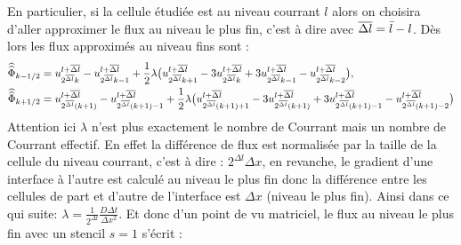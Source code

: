 En particulier, si la cellule étudiée est au niveau courrant $l$ alors on choisira d'aller approximer le flux au niveau le plus fin, c'est à dire avec ${\overline{\Delta l}} = \bar l - l$.
Dès lors les flux approximés au niveau fins sont : 
\begin{align}
    \widehat{\widehat{\Phi}}_{k-1/2} &=  u^{l+{\overline{\Delta l}}}_{2^{\overline{\Delta l}} k} -  u^{l+{\overline{\Delta l}}}_{2^{\overline{\Delta l}} k-1} + \frac{1}{2} \lambda \bigl(
         u^{l+{\overline{\Delta l}}}_{2^{\overline{\Delta l}} k+1}
         - 3 u^{l+{\overline{\Delta l}}}_{2^{\overline{\Delta l}} k}
         + 3 u^{l+{\overline{\Delta l}}}_{2^{\overline{\Delta l}} k-1}
         - u^{l+{\overline{\Delta l}}}_{2^{\overline{\Delta l}} k-2}
    \bigr),\\
    \widehat{\widehat{\Phi}}_{k+1/2} &=  u^{l+{\overline{\Delta l}}}_{2^{\overline{\Delta l}} (k+1)} -  u^{l+{\overline{\Delta l}}}_{2^{\overline{\Delta l}} (k+1)-1} + \frac{1}{2} \lambda \bigl(
         u^{l+{\overline{\Delta l}}}_{2^{\overline{\Delta l}} (k+1)+1}
         - 3 u^{l+{\overline{\Delta l}}}_{2^{\overline{\Delta l}} (k+1)}
         + 3 u^{l+{\overline{\Delta l}}}_{2^{\overline{\Delta l}} (k+1)-1}
         - u^{l+{\overline{\Delta l}}}_{2^{\overline{\Delta l}} (k+1)-2}
    \bigr)
\end{align}
Attention ici $\lambda$ n'est plus exactement le nombre de Courrant mais un nombre de Courrant effectif.
En effet la différence de flux est normalisée par la taille de la cellule du niveau courrant, c'est à dire : $2^{\Delta l} \Delta x$, en revanche, le gradient d'une interface à l'autre est calculé au niveau le plus fin donc la différence entre les cellules de part et d'autre de l'interface est $\Delta x$ (niveau le plus fin). 
Ainsi dans ce qui suite: $\lambda = \frac{1}{2^{\Delta l}} \frac{D \Delta t}{\Delta x^2}$.
Et donc d'un point de vu matriciel, le flux au niveau le plus fin avec un stencil $s=1$ s'écrit : 

